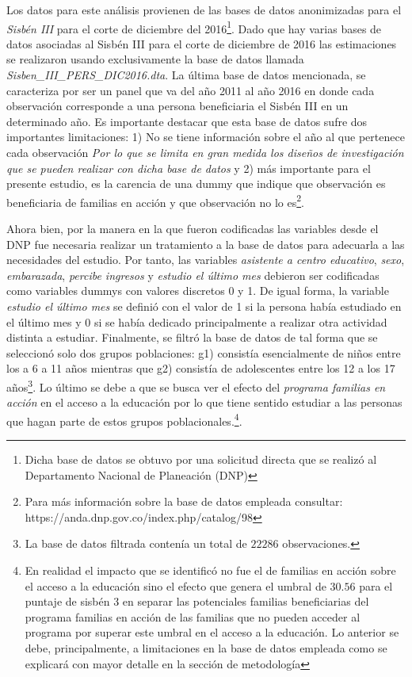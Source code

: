 \documentclass[AER]{AEA}
\begin{document}

Los datos para este análisis provienen de las bases de datos anonimizadas para el \textit{Sisbén III} para el corte de diciembre del 2016\footnote{Dicha base de datos se obtuvo por una solicitud directa que se realizó al Departamento Nacional de Planeación (DNP)}. Dado que hay varias bases de datos asociadas al Sisbén III para el corte de diciembre de 2016 las estimaciones se realizaron usando exclusivamente la base de datos llamada \textit{Sisben\_III\_PERS\_DIC2016.dta}. La última base de datos mencionada, se caracteriza por ser un panel que va del año 2011 al año 2016 en donde cada observación corresponde a una persona beneficiaria el Sisbén III en un determinado año. Es importante destacar que esta base de datos sufre dos importantes limitaciones: 1) No se tiene información sobre el año al que pertenece cada observación \textit{Por lo que se limita en gran medida los diseños de investigación que se pueden realizar con dicha base de datos} y 2) más importante para el presente estudio, es la carencia de una dummy que indique que observación es beneficiaria de familias en acción y que observación no lo es\footnote{Para más información sobre la base de datos empleada consultar: https://anda.dnp.gov.co/index.php/catalog/98}. 

Ahora bien, por la manera en la que fueron codificadas las variables desde el DNP fue necesaria realizar un tratamiento a la base de datos para adecuarla a las necesidades del estudio. Por tanto, las variables \textit{asistente a centro educativo}, \textit{sexo}, \textit{embarazada}, \textit{percibe ingresos} y \textit{estudio el último mes} debieron ser codificadas como variables dummys con valores discretos 0 y 1. De igual forma, la variable \textit{estudio el último mes} se definió con el valor de 1 si la persona había estudiado en el último mes y 0 si se había dedicado principalmente a realizar otra actividad distinta a estudiar. Finalmente, se filtró la base de datos de tal forma que se seleccionó solo dos grupos poblaciones: g1) consistía esencialmente de niños entre los a 6 a 11 años mientras que g2) consistía de adolescentes entre los 12 a los 17 años\footnote{La base de datos filtrada contenía un total de $22286$ observaciones.}. Lo último se debe a que se busca ver el efecto del \textit{programa familias en acción} en el acceso a la educación por lo que tiene sentido estudiar a las personas que hagan parte de estos grupos poblacionales.\footnote{En realidad el impacto que se identificó no fue el de familias en acción sobre el acceso a la educación sino el efecto que genera el umbral de $30.56$ para el puntaje de sisbén 3 en separar las potenciales familias beneficiarias del programa familias en acción de las familias que no pueden acceder al programa por superar este umbral en el acceso a la educación. Lo anterior se debe, principalmente, a limitaciones en la base de datos empleada como se explicará con mayor detalle en la sección de metodología}. 
\end{document}
